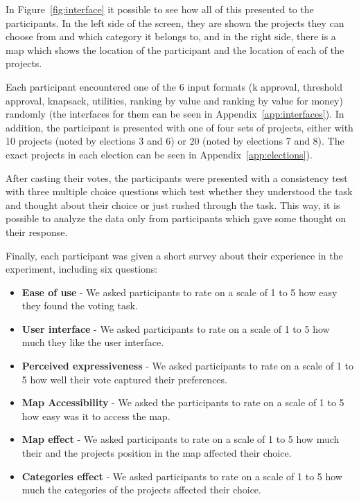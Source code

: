 \documentclass[10pt]{article}
\newcommand{\kibitz}[2]{\ifnum\Comments=1{\color{#1}{#2}}\fi}
\newcommand{\gb}[1]{\kibitz{green}{[GB:#1]}}
\begin{document}
In Figure~\ref{fig:interface} it possible to see how all of this presented to the participants. In the left side of the screen, they are shown the projects they can choose from and which category it belongs to, and in the right side, there is a map which shows the location of the participant and the location of each of the projects.

Each participant encountered one of the 6 input formats (k approval, threshold approval, knapsack, utilities, ranking by value and ranking by value for money) randomly (the interfaces for them can be seen in Appendix~\ref{app:interfaces}). In addition, the participant is presented with one of four sets of projects, either with 10 projects (noted by elections 3 and 6) or 20 (noted by elections 7 and 8). The exact projects in each election can be seen in Appendix~\ref{app:elections}).

After casting their votes, the participants were presented with  a consistency test with three multiple choice questions 
which test whether they understood the task and thought about their choice or just rushed through the task. This way, it is possible to analyze the data only from participants which gave some thought on their response.

Finally, each participant was given a short survey about their experience in the experiment, including six questions: %
\begin{itemize}
    \item \textbf{Ease of use} - We asked participants to rate on a scale of 1 to 5 how easy they found the voting task. %
    \item \textbf{User interface} - We asked participants to rate on a scale of 1 to 5 how much they like the user interface.
    \item \textbf{Perceived expressiveness} - We asked participants to rate on a scale of 1 to 5 how well their vote captured their preferences.
    \item \textbf{Map Accessibility} - We asked the participants to rate on a scale of 1 to 5 how easy was it to access the map.
    \item \textbf{Map effect} - We asked participants to rate on a scale of 1 to 5 how much their and the projects position in the map affected their choice.
    \item \textbf{Categories effect} - We asked participants to rate on a scale of 1 to 5 how much the categories of the projects affected their choice.
\end{itemize}
\end{document}
